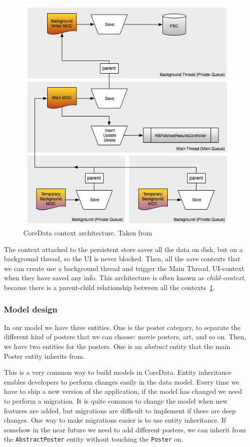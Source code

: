 \begin{figure}
\centering
\includegraphics[scale=0.75]{img/coredataarch.png}
\caption{\label{fig:coredataarch}CoreData context architecture. Taken
  from~\cite{coredataarch}} 
\end{figure} 

The context attached to the persistent store saves all the data on disk, but on a
background thread, so the UI is never blocked. Then, all the save contexts that we
can create use a background thread and trigger the Main Thread, UI-context when they
have saved any info. This architecture is often known as \emph{child-context},
because there is a parent-child relationship between all the
contexts~\ref{fig:coredataarch}. 

\subsubsection{Model design}
In our model we have three entities. One is the poster category, to separate
the different kind of posters that we can choose: movie posters, art, and so
on. Then, we have two entities for the posters. One is an \emph{abstract}
entity that the main Poster entity inherits from. 

This is a very common way to build models in CoreData. Entity inheritance
enables developers to perform changes easily in the data model. Every time we
have to ship a new version of the application, if the model has changed we need
to perform a migration. It is quite common to change the model when new
features are added, but migrations are difficult to implement if there are deep
changes. One way to make migrations easier is to use entity inheritance. If
somehow in the near future we need to add different posters, we can inherit
from the \texttt{AbstractPoster} entity without touching the \texttt{Poster}
on. 

